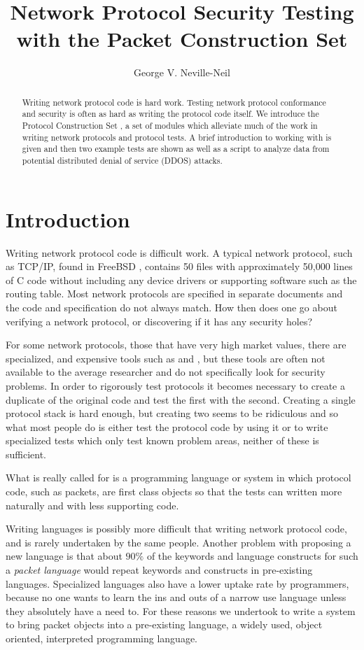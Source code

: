 \documentclass[11pt]{article}
\title{Network Protocol Security Testing with the Packet Construction Set}
\author{George V. Neville-Neil}
\begin{document}
\maketitle
\begin{abstract}
  Writing network protocol code is hard work.  Testing network
  protocol conformance and security is often as hard as writing the
  protocol code itself.  We introduce the Protocol Construction Set
  , a set of  modules which alleviate
  much of the work in writing network protocols and protocol tests.  A
  brief introduction to working with  is given and then
  two example tests are shown as well as a script to analyze data from
  potential distributed denial of service (DDOS) attacks.
\end{abstract}

\section{Introduction}
\label{sec:introduction}

Writing network protocol code is difficult work.  A typical network
protocol, such as TCP/IP, found in FreeBSD \cite{FreeBSD}, contains 50
files with approximately 50,000 lines of C code without including any
device drivers or supporting software such as the routing table.  Most
network protocols are specified in separate documents and the code and
specification do not always match.  How then does one go about
verifying a network protocol, or discovering if it has any security
holes?

For some network protocols, those that have very high market values,
there are specialized, and expensive tools such as \cite{anvl} and
\cite{smartbits}, but these tools are often not available to the
average researcher and do not specifically look for security problems.
In order to rigorously test protocols it becomes necessary to create
a duplicate of the original code and test the first with the second.
Creating a single protocol stack is hard enough, but creating two
seems to be ridiculous and so what most people do is either test the
protocol code by using it or to write specialized tests which only
test known problem areas, neither of these is sufficient.

What is really called for is a programming language or system in which
protocol code, such as packets, are first class objects so that
the tests can written more naturally and with less supporting code.

Writing languages is possibly more difficult that writing network
protocol code, and is rarely undertaken by the same people.  Another
problem with proposing a new language is that about $90\%$ of the
keywords and language constructs for such a \emph{packet language}
would repeat keywords and constructs in pre-existing languages.
Specialized languages also have a lower uptake rate by programmers,
because no one wants to learn the ins and outs of a narrow use
language unless they absolutely have a need to.  For these reasons we
undertook to write a system to bring packet objects into a
pre-existing language, \cite{python} a widely used,
object oriented, interpreted programming language.
\end{document}
